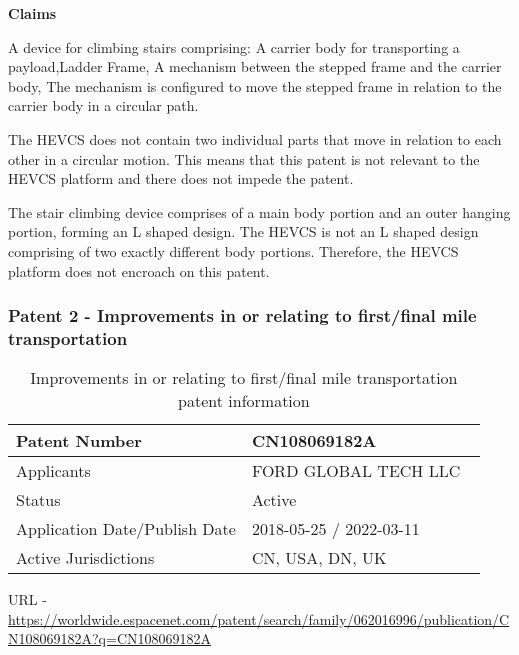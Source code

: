 \documentclass [12pt]{article}
\begin{document}
\textbf{Claims}

A device for climbing stairs comprising: A carrier body for transporting a payload,Ladder Frame, A mechanism between the stepped frame and the carrier body, The mechanism is configured to move the stepped frame in relation to the carrier body in a circular path.

The HEVCS does not contain two individual parts that move in relation to each other in a circular motion. This means that this patent is not relevant to the HEVCS platform and there does not impede the patent.

The stair climbing device comprises of a main body portion and an outer hanging portion, forming an L shaped design.
The HEVCS is not an L shaped design comprising of two exactly different body portions. Therefore, the HEVCS platform does not encroach on this patent.

\subsubsection{Patent 2 - Improvements in or relating to first/final mile transportation}

\begin{table}[H]
    \centering
    \setlength{\arrayrulewidth}{1.5pt}
    \begin{tabular}{|p{0.5\linewidth}|p{0.5\linewidth}|}
    \hline
    Patent Number & CN108069182A\\
    \hline
    Applicants & FORD GLOBAL TECH LLC\\
    \hline
    Status & Active\\
    \hline
    Application Date/Publish Date & 2018-05-25 / 2022-03-11\\
    \hline
    Active Jurisdictions & CN, USA, DN, UK\\
    \hline
    \end{tabular}
    \caption{Improvements in or relating to first/final mile transportation patent information}
    \label{table:improvements_in_or_relating_to_first_final_mile_transportation_patent_information}
\end{table}

URL - \url{https://worldwide.espacenet.com/patent/search/family/062016996/publication/CN108069182A?q=CN108069182A}
\end{document}
